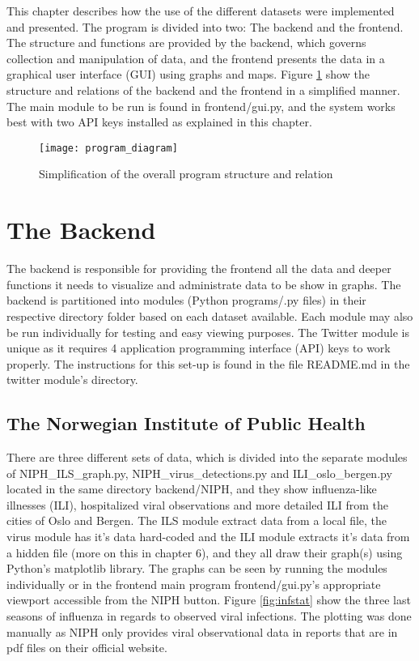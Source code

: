 This chapter describes how the use of the different datasets were implemented and presented. The program is divided into two: The backend and the frontend. The structure and functions are provided by the backend, which governs collection and manipulation of data, and the frontend presents the data in a graphical user interface (GUI) using graphs and maps. Figure \ref{fig:program} show the structure and relations of the backend and the frontend in a simplified manner. The main module to be run is found in frontend/gui.py, and the system works best with two API keys installed as explained in this chapter.

\begin{figure}[h]
\texttt{[image: program\_diagram]}
\centering
\caption{Simplification of the overall program structure and relation}
\label{fig:program}
\end{figure}

\section{The Backend}
The backend is responsible for providing the frontend all the data and deeper functions it needs to visualize and administrate data to be show in graphs. The backend is partitioned into modules (Python programs/.py files) in their respective directory folder based on each dataset available. Each module may also be run individually for testing and easy viewing purposes. 
The Twitter module is unique as it requires 4 application programming interface (API) keys to work properly. The instructions for this set-up is found in the file README.md in the twitter module's directory.




\subsection{The Norwegian Institute of Public Health}
There are three different sets of data, which is divided into the separate modules of NIPH\_ILS\_graph.py, NIPH\_virus\_detections.py and ILI\_oslo\_bergen.py located in the same directory backend/NIPH, and they show influenza-like illnesses (ILI), hospitalized viral observations and more detailed ILI from the cities of Oslo and Bergen. The ILS module extract data from a local file, the virus module has it's data hard-coded and the ILI module extracts it's data from a hidden file (more on this in chapter 6), and they all draw their graph(s) using Python's matplotlib library. The graphs can be seen by running the modules individually or in the frontend main program frontend/gui.py's appropriate viewport accessible from the NIPH button. Figure \ref{fig:infstat} show the three last seasons of influenza in regards to observed viral infections. The plotting was done manually as NIPH only provides viral observational data in reports that are in pdf files on their official website\cite{fhi}.

